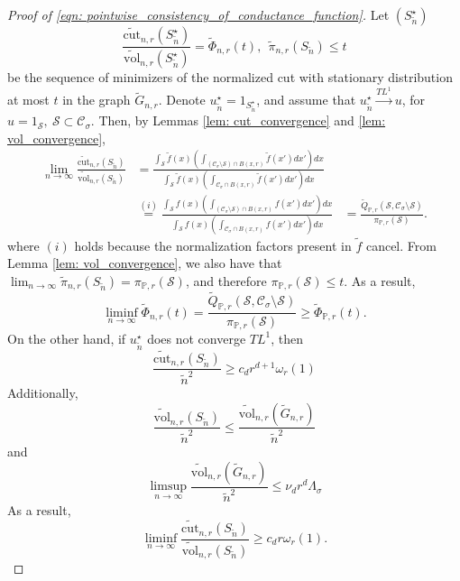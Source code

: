 \documentclass{article}
\newcommand{\vol}{\mathrm{vol}}
\newcommand{\1}{\mathbf{1}}
\newcommand{\cut}{\mathrm{cut}}
\newcommand{\Pbb}{\mathbb{P}}
\newcommand{\Sset}{\mathcal{S}}
\newcommand{\Cset}{\mathcal{C}}
\newcommand{\Csig}{\Cset_{\sigma}}
\newcommand{\wn}{\widetilde{n}}
\newcommand{\wf}{\widetilde{f}}
\theoremstyle{aldenthm}
\begin{document}
\begin{proof}[Proof of \eqref{eqn: pointwise_consistency_of_conductance_function}]
	Let $(S_{\wn}^{\star})$
	\begin{equation*}
	\frac{\widetilde{\cut}_{n,r}(S_{\wn}^{\star})}{\widetilde{\vol}_{n,r}(S_{\wn}^{\star})} = \widetilde{\Phi}_{n,r}(t),~~ \widetilde{\pi}_{n,r}(S_{\wn}) \leq t
	\end{equation*}
	be the sequence of minimizers of the normalized cut with stationary distribution at most $t$ in the graph $\widetilde{G}_{n,r}$. Denote $u_{\wn}^{\star} = 1_{S_{\wn}^{\star}}$, and assume that $u_{\wn}^{\star} \overset{TL^1}{\to} u$, for $u = 1_{\Sset}, ~\Sset \subset \Csig$. 
	Then, by Lemmas \ref{lem: cut_convergence} and \ref{lem: vol_convergence},
	\begin{align*}
	\lim_{n \to \infty} \frac{\widetilde{\cut}_{n,r}(S_{\wn})}{\widetilde{\vol}_{n,r}(S_{\wn})} & = \frac{\int_{\Sset} \wf(x) \left(\int_{(\Csig \setminus \Sset) \cap B(x,r)} \wf(x') dx' \right) dx}{\int_{\Sset} \wf(x) \left(\int_{\Csig \cap B(x,r)} \wf(x') dx' \right) dx} \\
	& \overset{(i)}{=} \frac{\int_{\Sset} f(x) \left(\int_{(\Csig \setminus \Sset) \cap B(x,r)} f(x') dx' \right) dx}{\int_{\Sset} f(x) \left(\int_{\Csig \cap B(x,r)} f(x') dx' \right) dx} 
	& = \frac{\widetilde{Q}_{\Pbb,r}(\Sset, \Csig \setminus \Sset)}{\pi_{\Pbb,r}(\Sset)}.
	\end{align*}
	where $(i)$ holds because the normalization factors present in $\wf$ cancel. From Lemma \ref{lem: vol_convergence}, we also have that $\lim_{n \to \infty}\widetilde{\pi}_{n,r}(S_{\wn}) = \pi_{\Pbb,r}(\Sset)$, and therefore $\pi_{\Pbb,r}(\Sset) \leq t$. As a result,
	\begin{equation*}
	\liminf_{n \to \infty} \widetilde{\Phi}_{n,r}(t) = \frac{\widetilde{Q}_{\Pbb,r}(\Sset, \Csig \setminus \Sset)}{\pi_{\Pbb,r}(\Sset)} \geq \widetilde{\Phi}_{\Pbb,r}(t).
	\end{equation*}
	On the other hand, if $u_{\wn}^{\star}$ does not converge $TL^1$, then
	\begin{equation*}
	\frac{\widetilde{\cut}_{n,r}(S_{\wn})}{\wn^2} \geq c_d r^{d+1} \omega_r(1)
	\end{equation*}
	Additionally,
	\begin{equation*}
	\frac{\widetilde{\vol}_{n,r}(S_{\wn})}{\wn^2} \leq \frac{\widetilde{\vol}_{n,r}(\widetilde{G}_{n,r})}{\wn^2}
	\end{equation*}
	and
	\begin{equation*}
	\limsup_{n \to \infty} \frac{\widetilde{\vol}_{n,r}(\widetilde{G}_{n,r})}{\wn^2} \leq \nu_d r^d \Lambda_{\sigma}
	\end{equation*}
	As a result,
	\begin{equation*}
	\liminf_{n \to \infty} \frac{\widetilde{\cut}_{n,r}(S_{\wn})}{\widetilde{\vol}_{n,r}(S_{\wn})} \geq c_d r \omega_r(1).
	\end{equation*}
\end{proof}
\end{document}
